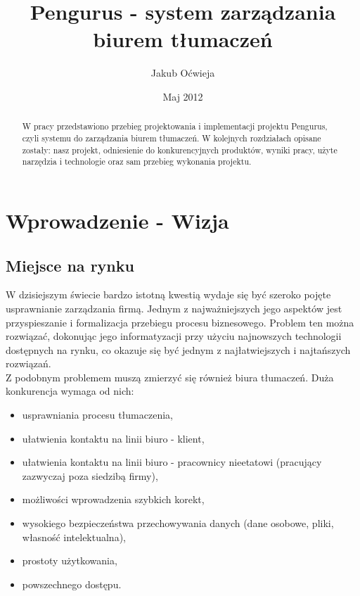 \documentclass[licencjacka]{pracamgr}
\author{Jakub Oćwieja}
\title{Pengurus - system zarządzania biurem tłumaczeń}
\date{Maj 2012}
\begin{document}
\maketitle

\begin{abstract}
  W pracy przedstawiono przebieg projektowania i implementacji projektu Pengurus, czyli systemu do zarządzania biurem tłumaczeń.
  W kolejnych rozdziałach opisane zostały: nasz projekt, odniesienie do konkurencyjnych produktów, wyniki pracy, użyte narzędzia i technologie oraz sam przebieg wykonania projektu.
\end{abstract}

\tableofcontents

\chapter{Wprowadzenie - Wizja}
\section{Miejsce na rynku}
W dzisiejszym świecie bardzo istotną kwestią wydaje się być szeroko pojęte usprawnianie zarządzania firmą. 
Jednym z najważniejszych jego aspektów jest przyspieszanie i formalizacja przebiegu procesu biznesowego. 
Problem ten można rozwiązać, dokonując jego informatyzacji przy użyciu najnowszych technologii dostępnych na rynku, co okazuje się być jednym z najłatwiejszych i najtańszych rozwiązań. \\

Z podobnym problemem muszą zmierzyć się również biura tłumaczeń. Duża konkurencja wymaga od nich: 
\begin{itemize}
\item usprawniania procesu tłumaczenia, 
\item ułatwienia kontaktu na linii biuro - klient, 
\item ułatwienia kontaktu na linii biuro - pracownicy nieetatowi (pracujący zazwyczaj poza siedzibą firmy), 
\item możliwości wprowadzenia szybkich korekt,
\item wysokiego bezpieczeństwa przechowywania danych (dane osobowe, pliki, własność intelektualna),
\item prostoty użytkowania,
\item powszechnego dostępu. 
\end{itemize} 
\end{document}
